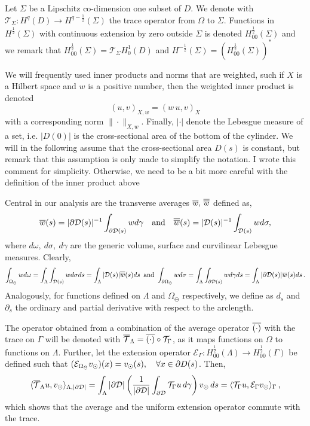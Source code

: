 \documentclass[r]{siamart171218}
\newcommand{\kent}[1]{{\color{blue}#1}}
\begin{document}
Let $\Sigma$ be a Lipschitz co-dimension one subset of $D$. 
We denote with $\mathcal{T}_\Sigma: H^q(D) \rightarrow H^{q-\frac 1 2}(\Sigma)$ the trace operator from $\Omega$ to $\Sigma$.
Functions in $H^{\frac 1 2}(\Sigma)$ with continuous extension by zero outside $\Sigma$ is denoted 
$H^{\frac 1 2}_{00}(\Sigma)$ and we remark that 
$H^{\frac 1 2}_{00}(\Sigma) = \mathcal{T}_\Sigma H^1_0(D)$
and  $H^{-\frac 1 2}(\Sigma) = (H^{\frac 1 2}_{00}(\Sigma))^*$

We will frequently used inner products and norms that are weighted, such if $X$ is a Hilbert space and $w$ is a positive number, then the
weighted inner product is denoted 
\[
(u,v)_{X,w} = (w \, u,  v)_X
\]
with a corresponding norm $\|\cdot\|_{X,w}$. Finally, 
$|\cdot|$ denote the Lebesgue measure of a set, i.e. $|D(0)|$ is the cross-sectional area of the bottom of the cylinder.
We will in the following assume that the cross-sectional area $D(s)$ is constant, but remark that this assumption is only made to simplify the notation. 
\kent{I wrote this comment for simplicity. Otherwise, we need to be a bit more careful with the definition of the inner product above}


Central in our analysis are the transverse averages $\overline{w},\,\overline{\overline{w}}$ defined as, 
\begin{gather*}
\overline{w}(s) = |\partial\mathcal{D}(s)|^{-1} \int_{\partial\mathcal{D}(s)} w d\gamma \quad \mbox{and} \quad 
\overline{\overline{w}}(s) = |\mathcal{D}(s)|^{-1} \int_{\mathcal{D}(s)} w d\sigma, 
\end{gather*}
where $d\omega, \ d\sigma, \ d\gamma$ are the generic volume, surface and curvilinear Lebesgue measures.
Clearly, 
\begin{gather*}
\int_{\Omega_{\ominus}} w d\omega 
= \int_\Lambda \int_{\mathcal{D}(s)} w d\sigma ds
= \int_\Lambda |\mathcal{D}(s)|\avrd{w}(s) ds\, \ \mbox{and} \ 
\int_{\partial\Omega_{\ominus}} w d\sigma 
= \int_\Lambda \int_{\partial\mathcal{D}(s)} w d\gamma ds
= \int_\Lambda  |\partial \mathcal{D}(s)| \avrc{w}(s) ds\,. 
\end{gather*}
Analogously, for functions defined on $\Lambda$ and $\Omega_\ominus$ respectively, 
we define as $d_s$ and $\partial_s$ the ordinary and partial derivative with respect to the arclength.



The operator obtained from a combination of the average operator $\overline{(\cdot)}$ with the trace on $\Gamma$ will be denoted with ${\overline{\mathcal{T}}_\Lambda} = \overline{(\cdot)} \circ {\mathcal{T}_\Gamma}$,
as it maps functions on $\Omega$ to functions on $\Lambda$.
Further, let the extension operator $\mathcal{E}_{\Gamma}: H^{\frac 1 2}_{00}(\Lambda) \rightarrow H^{\frac 1 2}_{00}(\Gamma)$ be defined such that
 $(\mathcal{E}_{\Omega_{\ominus}}v_{\odot})(x)=v_{\odot}(s), \quad \forall x\in \partial D(s)$.
Then, 
\begin{equation}\label{eq:ext}
\langle \mtrace u, \vd \rangle_{\Lambda, |\DD|} 
= \int _{\Lambda} |\DD| \left( \frac{1}{|\DD|} \int_{\DD} \trace u \, d\gamma \right) \vd \, ds 
= \langle \trace u, \ext \vd\rangle_{\Gamma}\,,
\end{equation} 
which shows that the average and the uniform extension operator commute with the trace.
\end{document}
